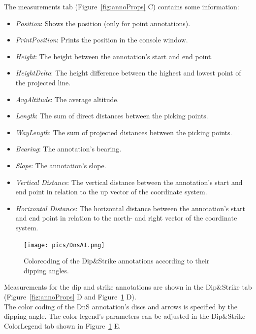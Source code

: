 The measurements tab (Figure~\ref{fig:annoProps} C) contains some information:
\begin{itemize}
	\item \textit{Position}: Shows the position (only for point annotations).
	\item \textit{PrintPosition}: Prints the position in the console window.
	\item \textit{Height}:  The height between the annotation's start and end point.
	\item \textit{HeightDelta}: The height difference between the highest and lowest point of the projected line.
	\item \textit{AvgAltitude}: The average altitude.
	\item \textit{Length}: The sum of direct distances between the picking points.
	\item \textit{WayLength}: The sum of projected distances between the picking points.
	\item \textit{Bearing}: The annotation's bearing.
	\item \textit{Slope}: The annotation's slope.
	\item \textit{Vertical Distance}: The vertical distance between the annotation's start and end point in relation to the up vector of the coordinate system.
	\item \textit{Horizontal Distance}: The horizontal distance between the annotation's start and end point in relation to the north- and right vector of the coordinate system.
\end{itemize}

\begin{figure}[h]
    	\centering
    		\texttt{[image: pics/DnsAI.png]}
    	\caption[Viewer Features DnSColorLegend]{Colorcoding of the Dip\&Strike annotations according to their dipping angles.}
    	\label{fig:dnSColorLegend}
   \end{figure}
	
Measurements for the dip and strike annotations are shown in the Dip\&Strike tab (Figure~\ref{fig:annoProps} D and Figure~\ref{fig:dnSColorLegend} D).\\

The color coding of the DnS annotation's discs and arrows is specified by the dipping angle. The color legend's parameters can be adjusted in the
Dip\&Strike ColorLegend tab shown in Figure~\ref{fig:dnSColorLegend} E.

%


